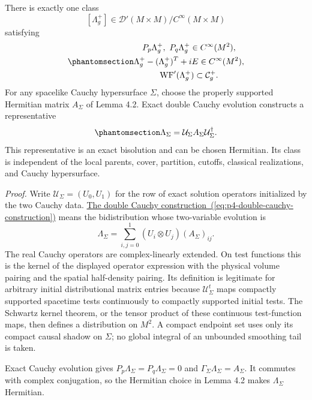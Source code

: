 \documentclass[
  english,
  11pt,
  reqno]{amsart}
\begin{document}
There is exactly one class \[
[\Lambda_g^+]\in\mathcal D'(M\times M)/C^\infty(M\times M)
\] satisfying
\begin{equation}\protect\phantomsection\label{eq:p4-global-wave-admission}{\begin{gathered}
P_p\Lambda_g^+,\ P_q\Lambda_g^+\in C^\infty(M^2), \\
\Lambda_g^+-(\Lambda_g^+)^T+iE\in C^\infty(M^2), \\
\operatorname{WF}'(\Lambda_g^+)\subset\mathcal C_g^+.
\end{gathered}}\end{equation} For any spacelike Cauchy hypersurface \(\Sigma\), choose
the properly supported Hermitian matrix \(A_\Sigma\) of Lemma 4.2. Exact
double Cauchy evolution constructs a representative
\begin{equation}\protect\phantomsection\label{eq:p4-double-cauchy-construction}{
\Lambda_\Sigma
=\mathcal U_\Sigma A_\Sigma\mathcal U_\Sigma^\dagger.
}\end{equation} This representative is an exact bisolution and can be
chosen Hermitian. Its class is independent of the local parents, cover,
partition, cutoffs, classical realizations, and Cauchy hypersurface.

\emph{Proof.} Write \(\mathcal U_\Sigma=(U_0,U_1)\) for the row of exact
solution operators initialized by the two Cauchy data.
\hyperref[eq:p4-double-cauchy-construction]{The double Cauchy
construction~(\ref*{eq:p4-double-cauchy-construction})} means the bidistribution whose two-variable evolution is
\[
\Lambda_\Sigma
=\sum_{i,j=0}^1(U_i\otimes U_j)(A_\Sigma)_{ij}.
\] The real Cauchy operators are complex-linearly extended. On test
functions this is the kernel of the displayed operator expression with
the physical volume pairing and the spatial half-density pairing. Its
definition is legitimate for arbitrary initial distributional matrix
entries because \(\mathcal U_\Sigma^t\) maps compactly supported
spacetime tests continuously to compactly supported initial tests. The
Schwartz kernel theorem, or the tensor product of these continuous
test-function maps, then defines a distribution on \(M^2\). A compact
endpoint set uses only its compact causal shadow on \(\Sigma\); no
global integral of an unbounded smoothing tail is taken.

Exact Cauchy evolution gives \(P_p\Lambda_\Sigma=P_q\Lambda_\Sigma=0\)
and \(\Gamma_\Sigma\Lambda_\Sigma=A_\Sigma\). It commutes with complex
conjugation, so the Hermitian choice in Lemma 4.2 makes
\(\Lambda_\Sigma\) Hermitian.
\end{document}
